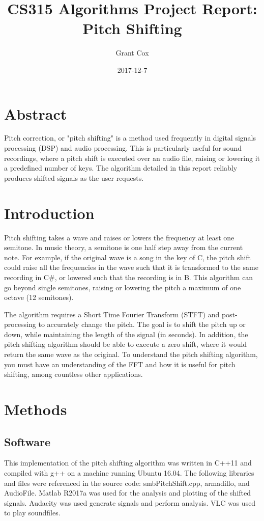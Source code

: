 \documentclass{article}
\title{CS315 Algorithms Project Report: Pitch Shifting}
\date{2017-12-7}
\author{Grant Cox}
\begin{document}
	\maketitle

\section{Abstract}

Pitch correction, or "pitch shifting" is a method used frequently in digital signals processing (DSP) and audio processing. This is particularly useful for sound recordings, where a pitch shift is executed over an audio file, raising or lowering it a predefined number of keys. The algorithm detailed in this report reliably produces shifted signals as the user requests.

\section{Introduction}
Pitch shifting takes a wave and raises or lowers the frequency at least one semitone. In music theory, a semitone is one half step away from the current note. For example, if the original wave is a song in the key of C, the pitch shift could raise all the frequencies in the wave such that it is transformed to the same recording in C\#, or lowered such that the recording is in B. This algorithm can go beyond single semitones, raising or lowering the pitch a maximum of one octave (12 semitones).

The algorithm requires a Short Time Fourier Transform (STFT) and post-processing to accurately change the pitch. The goal is to shift the pitch up or down, while maintaining the length of the signal (in seconds). In addition, the pitch shifting algorithm should be able to execute a zero shift, where it would return the same wave as the original. To understand the pitch shifting algorithm, you must have an understanding of the FFT and how it is useful for pitch shifting, among countless other applications.

\section{Methods}
\subsection{Software}
This implementation of the pitch shifting algorithm was written in C++11 and compiled with  g++ on a machine running Ubuntu 16.04. The following libraries and files were referenced in the source code: smbPitchShift.cpp, armadillo, and AudioFile. Matlab R2017a was used for the analysis and plotting of the shifted signals. Audacity was used generate signals and perform analysis. VLC was used to play soundfiles.
\end{document}

